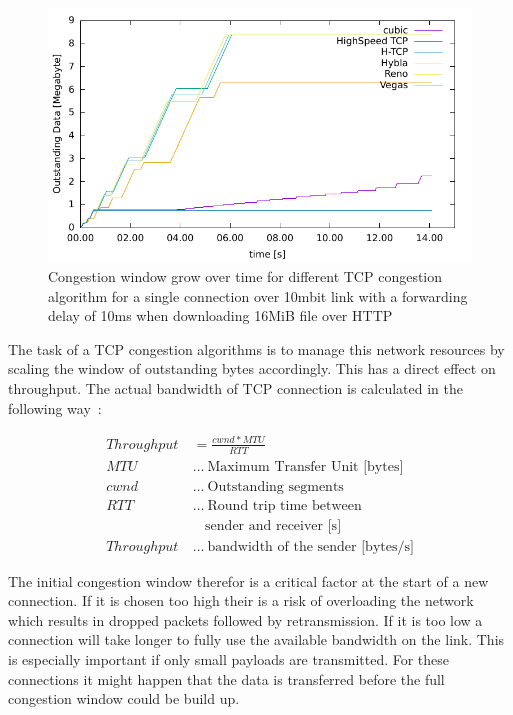 \begin{figure}[ht]
\footnotesize
\includegraphics[scale=1]{figure/b2a_owin.pdf}
\caption{Congestion window grow over time for different TCP congestion
algorithm for a single connection over 10mbit link with a forwarding delay of
10ms when downloading 16MiB file over HTTP}
\label{fig:cwnd_tcp_algos}
\end{figure}

The task of a TCP congestion algorithms is to manage this network resources by
scaling the window of outstanding bytes accordingly. This has a direct effect on
throughput. The actual bandwidth of TCP connection is calculated in the
following way~\cite{opac-b1120676}:

\begin{align}
  Throughput &= \frac{cwnd * MTU}{RTT} \\
  MTU~&\dots~\text{Maximum Transfer Unit [bytes]} \nonumber\\
  cwnd~&\dots~\text{Outstanding segments} \nonumber\\
  RTT~&\dots~\text{Round trip time between} \nonumber\\
      &~~~~\text{sender and receiver [s]} \nonumber\\
  Throughput~&\dots~\text{bandwidth of the sender [bytes/s]} \nonumber
\end{align}

The initial congestion window therefor is a critical factor at the start of a
new connection. If it is chosen too high their is a risk of overloading the
network which results in dropped packets followed by retransmission. If it is
too low a connection will take longer to fully use the available bandwidth on the
link. This is especially important if only small payloads are transmitted. For
these connections it might happen that the data is transferred before the full
congestion window could be build up.

